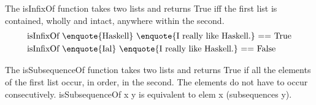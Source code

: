 The isInfixOf function takes two lists and returns True iff the first list is contained, wholly and intact, anywhere within the second.
\begin{align*}
	&\text{isInfixOf \enquote{Haskell} \enquote{I really like Haskell.} == True}\\
	&\text{isInfixOf \enquote{Ial} \enquote{I really like Haskell.} == False}
\end{align*}

The isSubsequenceOf function takes two lists and returns True if all the elements of the first list occur, in order, in the second. The elements do not have to occur consecutively.
isSubsequenceOf x y is equivalent to elem x (subsequences y).